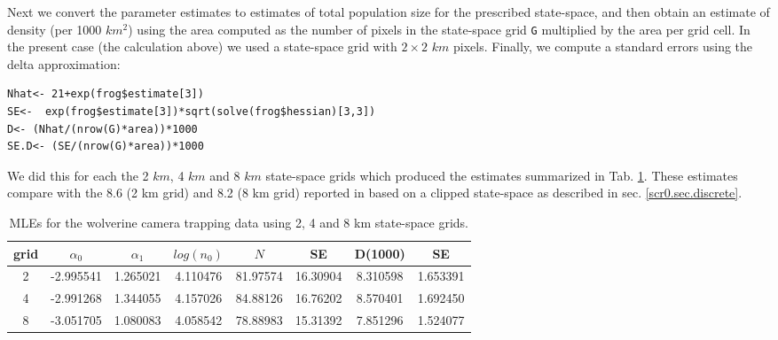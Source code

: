 Next we convert the parameter estimates to estimates of total
population size for the prescribed state-space, and then obtain an
estimate of density (per 1000
$km^2$) using the area computed as the number of pixels in the
state-space grid \mbox{\tt G} multiplied by the area per grid cell. In
the present case (the calculation above) we used a state-space grid
with $2 \times 2$ $km$ pixels.  Finally, we compute
a standard errors using the delta approximation: 
\begin{verbatim}
Nhat<- 21+exp(frog$estimate[3])
SE<-  exp(frog$estimate[3])*sqrt(solve(frog$hessian)[3,3])
D<- (Nhat/(nrow(G)*area))*1000
SE.D<- (SE/(nrow(G)*area))*1000
\end{verbatim}
We did this for each the 2 $km$, 4 $km$ and 8 $km$ state-space grids
which produced the estimates summarized in Tab. \ref{mle.tab.wolv}.
These estimates compare with the 8.6 (2 km grid) and 8.2 (8 km grid)
reported in 
\citet{royle_etal:2011jwm} based on a clipped state-space as described
in sec. \ref{scr0.sec.discrete}.

\begin{table}
\centering
\caption{MLEs for the wolverine camera trapping data using 2, 4 and 8 km state-space grids.}
\begin{tabular}{cccccccc}
\hline \hline
grid &  $\alpha_0$  &  $\alpha_1$ &   $log(n_0)$  & $N$   &  SE & D(1000) &  SE \\ \hline
2  &  -2.995541& 1.265021 &4.110476 &81.97574& 16.30904 &8.310598 &1.653391\\
4  &  -2.991268&1.344055  &4.157026 &84.88126& 16.76202 &8.570401& 1.692450\\
8   & -3.051705& 1.080083 &4.058542 &78.88983& 15.31392 &7.851296& 1.524077\\
\end{tabular}
\label{mle.tab.wolv}
\end{table}


\begin{comment}
\subsection{
Exercises
}

{\flushleft
1.	Compute the 95\% confidence interval for wolverine density,
somehow. Comment on the practical implication of this level of precision.
}

{\flushleft
2.	Compute the AIC of this model and modify \mbox{\tt intlik3}
 to consider alternative link functions (at least one additional) and
 compare the  AIC of the different models and the estimates. Comment. 
}
\end{comment}


